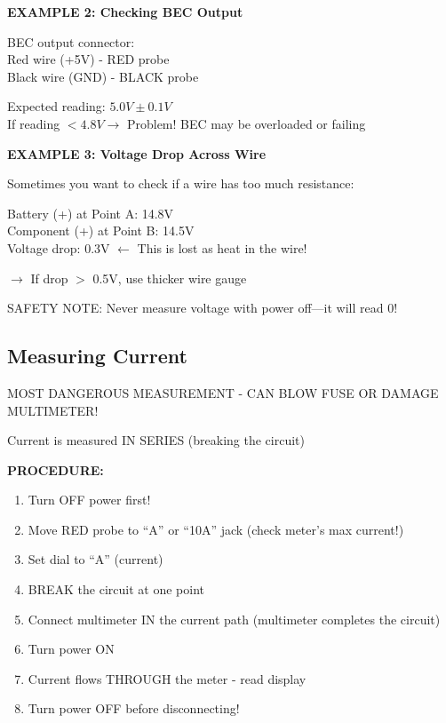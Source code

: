 \documentclass[11pt,letterpaper]{article}
\begin{document}
\begin{examplebox}
\textbf{EXAMPLE 2: Checking BEC Output}

BEC output connector:\\
Red wire (+5V) - RED probe\\
Black wire (GND) - BLACK probe

Expected reading: $5.0V \pm 0.1V$\\
If reading $< 4.8V \rightarrow$ Problem! BEC may be overloaded or failing
\end{examplebox}

\begin{examplebox}
\textbf{EXAMPLE 3: Voltage Drop Across Wire}

Sometimes you want to check if a wire has too much resistance:

Battery (+) at Point A: 14.8V\\
Component (+) at Point B: 14.5V\\
Voltage drop: 0.3V $\leftarrow$ This is lost as heat in the wire!

$\rightarrow$ If drop $>$ 0.5V, use thicker wire gauge
\end{examplebox}

\begin{warningbox}
SAFETY NOTE: Never measure voltage with power off—it will read 0!
\end{warningbox}

\subsection{Measuring Current}

\begin{warningbox}
MOST DANGEROUS MEASUREMENT - CAN BLOW FUSE OR DAMAGE MULTIMETER!
\end{warningbox}

Current is measured IN SERIES (breaking the circuit)

\textbf{PROCEDURE:}
\begin{enumerate}
\item Turn OFF power first!
\item Move RED probe to ``A'' or ``10A'' jack (check meter's max current!)
\item Set dial to ``A'' (current)
\item BREAK the circuit at one point
\item Connect multimeter IN the current path (multimeter completes the circuit)
\item Turn power ON
\item Current flows THROUGH the meter - read display
\item Turn power OFF before disconnecting!
\end{enumerate}
\end{document}

